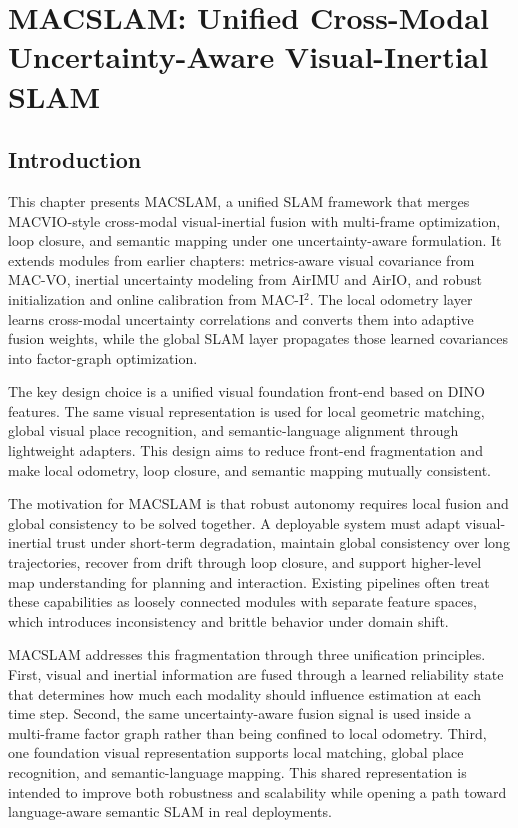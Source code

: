 \chapter{MACSLAM: Unified Cross-Modal Uncertainty-Aware Visual-Inertial SLAM} \label{chapter:macslam}
\label{chapter:macvio}

\section{Introduction}

This chapter presents MACSLAM, a unified SLAM framework that merges MACVIO-style cross-modal visual-inertial fusion with multi-frame optimization, loop closure, and semantic mapping under one uncertainty-aware formulation.
It extends modules from earlier chapters: metrics-aware visual covariance from MAC-VO, inertial uncertainty modeling from AirIMU and AirIO, and robust initialization and online calibration from MAC-I$^2$.
The local odometry layer learns cross-modal uncertainty correlations and converts them into adaptive fusion weights, while the global SLAM layer propagates those learned covariances into factor-graph optimization.

The key design choice is a unified visual foundation front-end based on DINO features.
The same visual representation is used for local geometric matching, global visual place recognition, and semantic-language alignment through lightweight adapters.
This design aims to reduce front-end fragmentation and make local odometry, loop closure, and semantic mapping mutually consistent.

The motivation for MACSLAM is that robust autonomy requires local fusion and global consistency to be solved together.
A deployable system must adapt visual-inertial trust under short-term degradation, maintain global consistency over long trajectories, recover from drift through loop closure, and support higher-level map understanding for planning and interaction.
Existing pipelines often treat these capabilities as loosely connected modules with separate feature spaces, which introduces inconsistency and brittle behavior under domain shift.

MACSLAM addresses this fragmentation through three unification principles.
First, visual and inertial information are fused through a learned reliability state that determines how much each modality should influence estimation at each time step.
Second, the same uncertainty-aware fusion signal is used inside a multi-frame factor graph rather than being confined to local odometry.
Third, one foundation visual representation supports local matching, global place recognition, and semantic-language mapping.
This shared representation is intended to improve both robustness and scalability while opening a path toward language-aware semantic SLAM in real deployments.

